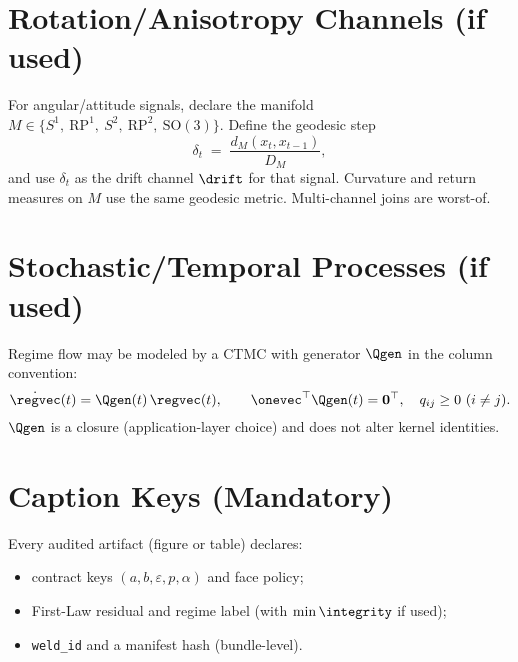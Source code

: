 \section{Rotation/Anisotropy Channels (if used)}
\label{apx:rotation}
For angular/attitude signals, declare the manifold \(M\in\{S^1,\ \mathrm{RP}^1,\ S^2,\ \mathrm{RP}^2,\ \mathrm{SO}(3)\}\). Define the geodesic step
\[
\delta_t \;=\; \frac{d_M(x_t,x_{t-1})}{D_M},
\]
and use \(\delta_t\) as the drift channel \(\drift\) for that signal. Curvature and return measures on \(M\) use the same geodesic metric. Multi-channel joins are worst-of.

\section{Stochastic/Temporal Processes (if used)}
\label{apx:ctmc}
Regime flow may be modeled by a CTMC with generator \(\Qgen\) in the column convention:
\[
\dot{\regvec}(t) = \Qgen(t)\,\regvec(t),\qquad \onevec^\top \Qgen(t)=\mathbf{0}^\top,\quad q_{ij}\ge 0\ (i\ne j).
\]
\(\Qgen\) is a closure (application-layer choice) and does not alter kernel identities.

\section{Caption Keys (Mandatory)}
\label{apx:captions}
Every audited artifact (figure or table) declares:
\begin{itemize}[leftmargin=1.25em]
  \item contract keys \((a,b,\varepsilon,p,\alpha)\) and face policy;
  \item First-Law residual and regime label (with \(\min\integrity\) if used);
  \item \texttt{weld\_id} and a manifest hash (bundle-level).
\end{itemize}

